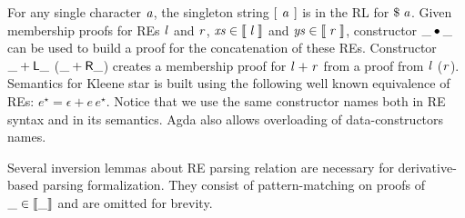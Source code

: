 \documentclass[sigconf]{acmart}
\theoremstyle{definition}
\newcommand{\D}[1]{\blue{\mathsf{#1}}}
\newcommand{\C}[1]{\red{\mathsf{#1}}}
\newcommand{\V}[1]{\purple{\mathit{#1}}}
\begin{document}
For any single character \ensuremath{\V{a}}, the singleton
string \ensuremath{[\mskip1.5mu \;\V{a}\;\mskip1.5mu]} is in the RL
for \ensuremath{\C{\$}\;\V{a}}. Given membership proofs for REs
\ensuremath{\V{l}} and \ensuremath{\V{r}}, \ensuremath{\V{xs}\;\D{\in\llbracket}\;\V{l}\;\D{\rrbracket}} and \ensuremath{\V{ys}\;\D{\in\llbracket}\;\V{r}\;\D{\rrbracket}}, constructor
\ensuremath{\C{\_\bullet\_}} can be used to build a proof
for the concatenation of these REs.  Constructor
\ensuremath{\C{\_+L\_}} (\ensuremath{\C{\_+R\_}}) creates a membership proof
for \ensuremath{\V{l}\;\C{+}\;\V{r}} from a proof from \ensuremath{\V{l}} (\ensuremath{\V{r}}). Semantics for Kleene star
is built using the following well known equivalence of REs: $e^\star
= \epsilon + e\,e^\star$. Notice that we use the same constructor names both in RE syntax and 
in its semantics. Agda also allows overloading of data-constructors names.

Several inversion lemmas about RE parsing relation are necessary for
derivative-based parsing formalization. They consist of
pattern-matching on proofs of
\ensuremath{\D{\_\in\llbracket\_\rrbracket}} and are omitted for
brevity.
\end{document}

